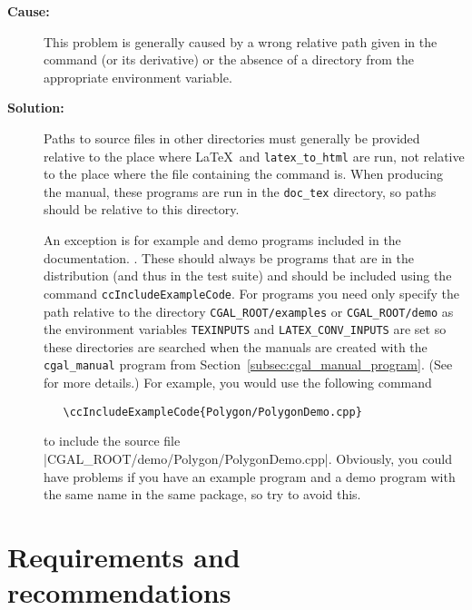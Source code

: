 \begin{description}
\item[{\bf Cause:}] This problem is generally caused by a wrong relative path
given in the \verb|| command (or its derivative) or the absence of a
directory from the appropriate environment variable.

\item[{\bf Solution:}] Paths to source files in other directories must
generally be provided relative to the place where \LaTeX\ and
\texttt{latex\_to\_html} are run, not relative to the place where
the file containing the command is.  When producing the manual,
these programs are run in the \texttt{doc\_tex} directory, so paths
should be relative to this directory.

An exception is for example and demo programs included in the documentation.
.  These should always
be programs that are in the distribution (and thus in the test suite)
and should be included using the command \texttt{ccIncludeExampleCode}.  For
programs you need only specify the path relative to the directory
\texttt{CGAL\_ROOT/examples} or \texttt{CGAL\_ROOT/demo} as the environment
variables \texttt{TEXINPUTS} and \texttt{LATEX\_CONV\_INPUTS} are set so these
directories are searched when the manuals are created with the
\texttt{cgal\_manual} program from Section~\ref{subsec:cgal_manual_program}.
(See
for more details.)
For example, you would use the following command
\begin{verbatim}
   \ccIncludeExampleCode{Polygon/PolygonDemo.cpp}
\end{verbatim}
to include the source file \nonlinkedpath|CGAL_ROOT/demo/Polygon/PolygonDemo.cpp|.
Obviously, you could have problems if you have an example program and a demo
program with the same name in the same package, so try to avoid this.
\end{description}


\section{Requirements and recommendations\label{sec:specification_req_and_rec}}

